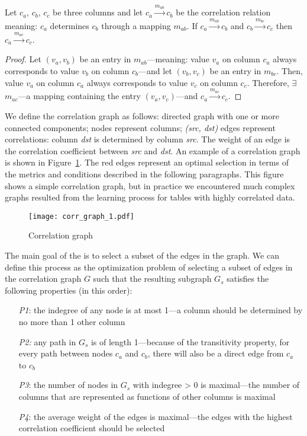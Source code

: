 \begin{theorem}
\label{subsec:ps:corr:theorem1}
Let \(c_{a}\), \(c_{b}\), \(c_{c}\) be three columns and let \(c_{a} \xrightarrow{m_{ab}} c_{b}\) be the correlation relation meaning: \(c_{a}\) determines \(c_{b}\) through a mapping \(m_{ab}\). If \(c_{a} \xrightarrow{m_{ab}} c_{b}\) and \(c_{b} \xrightarrow{m_{bc}} c_{c}\) then \(c_{a} \xrightarrow{m_{ac}} c_{c}\).
\end{theorem}
\begin{proof}
Let \((v_{a}, v_{b})\) be an entry in \(m_{ab}\)---meaning: value \(v_{a}\) on column \(c_{a}\) always corresponds to value \(v_{b}\) on column \(c_{b}\)---and let \((v_{b}, v_{c})\) be an entry in \(m_{bc}\). Then, value \(v_{a}\) on column \(c_{a}\) always corresponds to value \(v_{c}\) on column \(c_{c}\). Therefore, \(\exists\) \(m_{ac}\)---a mapping containing the entry \((v_{a}, v_{c})\)---and \(c_{a} \xrightarrow{m_{ac}} c_{c}\).
\end{proof}

We define the correlation graph as follows: directed graph with one or more connected components; nodes represent columns; \textit{(src, dst)} edges represent correlations: column \textit{dst} is determined by column \textit{src}. The weight of an edge is the correlation coefficient between \textit{src} and \textit{dst}. An example of a correlation graph is shown in Figure~\ref{fig:ps:columncorrelation:corrgraph1}. The red edges represent an optimal selection in terms of the metrics and conditions described in the following paragraphs. This figure shows a simple correlation graph, but in practice we encountered much complex graphs resulted from the learning process for tables with highly correlated data.

\begin{figure}[h]
  \centering
  \texttt{[image: corr\_graph\_1.pdf]}
  \caption{Correlation graph}
  \label{fig:ps:columncorrelation:corrgraph1}
\end{figure}

The main goal of the  is to select a subset of the edges in the graph. We can define this process as the optimization problem of selecting a subset of edges in the correlation graph \(G\) such that the resulting subgraph \(G_{s}\) satisfies the following properties (in this order):
\begin{itemize}
    \item[\textit{P1}:] the indegree of any node is at most 1---a column should be determined by no more than 1 other column
    \item[\textit{P2:}] any path in \(G_{s}\) is of length 1---because of the transitivity property, for every path between nodes \(c_{a}\) and \(c_{b}\), there will also be a direct edge from \(c_{a}\) to \(c_{b}\)
    \item[\textit{P3}:] the number of nodes in \(G_{s}\) with indegree > 0 is maximal---the number of columns that are represented as functions of other columns is maximal
    \item[\textit{P4}:] the average weight of the edges is maximal---the edges with the highest correlation coefficient should be selected
\end{itemize}


